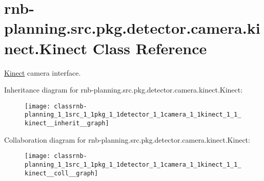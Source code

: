\hypertarget{classrnb-planning_1_1src_1_1pkg_1_1detector_1_1camera_1_1kinect_1_1_kinect}{}\section{rnb-\/planning.src.\+pkg.\+detector.\+camera.\+kinect.\+Kinect Class Reference}
\label{classrnb-planning_1_1src_1_1pkg_1_1detector_1_1camera_1_1kinect_1_1_kinect}


\hyperlink{classrnb-planning_1_1src_1_1pkg_1_1detector_1_1camera_1_1kinect_1_1_kinect}{Kinect} camera interface.  




Inheritance diagram for rnb-\/planning.src.\+pkg.\+detector.\+camera.\+kinect.\+Kinect\+:\nopagebreak
\begin{figure}[H]
\begin{center}
\leavevmode
\texttt{[image: classrnb-planning\_1\_1src\_1\_1pkg\_1\_1detector\_1\_1camera\_1\_1kinect\_1\_1\_kinect\_\_inherit\_\_graph]}
\end{center}
\end{figure}


Collaboration diagram for rnb-\/planning.src.\+pkg.\+detector.\+camera.\+kinect.\+Kinect\+:\nopagebreak
\begin{figure}[H]
\begin{center}
\leavevmode
\texttt{[image: classrnb-planning\_1\_1src\_1\_1pkg\_1\_1detector\_1\_1camera\_1\_1kinect\_1\_1\_kinect\_\_coll\_\_graph]}
\end{center}
\end{figure}
